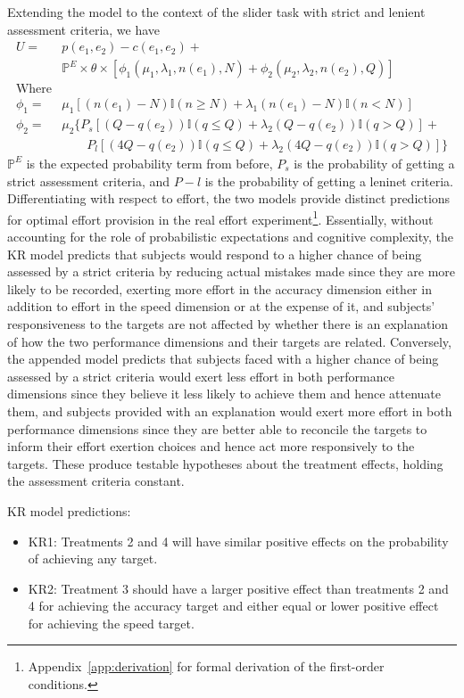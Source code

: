 \documentclass[12pt, letterpaper]{article}
\begin{document}
Extending the model to the context of the slider task with strict and lenient assessment criteria, we have
\[
\begin{aligned}
U = & p(e_1, e_2) - c(e_1, e_2) + \\
    & \mathbb{P}^E \times \theta \times [\phi_1(\mu_1, \lambda_1, n(e_1), N) + \phi_2(\mu_2, \lambda_2, n(e_2), Q)] \\
\text{Where}
\\
\phi_1 = & \mu_1[(n(e_1)-N)\mathbb{I}(n \geq N) + \lambda_1(n(e_1)-N)\mathbb{I}(n<N)] \\
\phi_2 = & \mu_2 \{P_s[(Q-q(e_2))\mathbb{I}(q \leq Q) + \lambda_2(Q-q(e_2))\mathbb{I}(q>Q)] + \\
& \qquad P_l[(4Q-q(e_2))\mathbb{I}(q \leq Q) + \lambda_2(4Q-q(e_2))\mathbb{I}(q>Q)]\}
\end{aligned}
\]
$\mathbb{P}^E$ is the expected probability term from before, $P_s$ is the probability of getting a strict assessment criteria, and $P-l$ is the probability of getting a leninet criteria. Differentiating with respect to effort, the two models provide distinct predictions for optimal effort provision in the real effort experiment\footnote{Appendix~\ref{app:derivation} for formal derivation of the first-order conditions.}. Essentially, without accounting for the role of probabilistic expectations and cognitive complexity, the KR model predicts that subjects would respond to a higher chance of being assessed by a strict criteria by reducing actual mistakes made since they are more likely to be recorded, exerting more effort in the accuracy dimension either in addition to effort in the speed dimension or at the expense of it, and subjects' responsiveness to the targets are not affected by whether there is an explanation of how the two performance dimensions and their targets are related. Conversely, the appended model predicts that subjects faced with a higher chance of being assessed by a strict criteria would exert less effort in both performance dimensions since they believe it less likely to achieve them and hence attenuate them, and subjects provided with an explanation would exert more effort in both performance dimensions since they are better able to reconcile the targets to inform their effort exertion choices and hence act more responsively to the targets. These produce testable hypotheses about the treatment effects, holding the assessment criteria constant.

\noindent KR model predictions:

\begin{itemize}
\item KR1: Treatments 2 and 4 will have similar positive effects on the probability of achieving any target.
\item KR2: Treatment 3 should have a larger positive effect than treatments 2 and 4 for achieving the accuracy target and either equal or lower positive effect for achieving the speed target.
\end{itemize}
\end{document}
